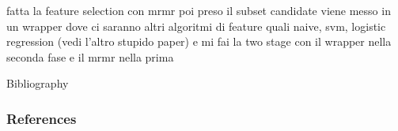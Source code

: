 \documentclass{beamer}
\begin{document}
\begin{frame}
	\frametitle{}
	fatta la feature selection con mrmr poi preso il subset candidate viene messo in un wrapper dove ci saranno altri algoritmi di feature quali naive, svm, logistic regression (vedi l'altro stupido paper) e mi fai la two stage con il wrapper nella seconda fase e il mrmr nella prima

\end{frame}

\begin{frame}{Bibliography}
	\frametitle{References}
	
	
\end{frame}
\end{document}
